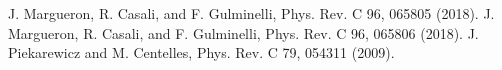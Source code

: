 \documentclass[11pt]{article}
\begin{document}
\begin{thebibliography}{99}
 J. Margueron, R. Casali, and F. Gulminelli, Phys. Rev. C 96, 065805 (2018).
 J. Margueron, R. Casali, and F. Gulminelli, Phys. Rev. C 96, 065806 (2018).
 J. Piekarewicz and M. Centelles, Phys. Rev. C 79, 054311 (2009).
\end{thebibliography}
\end{document}
